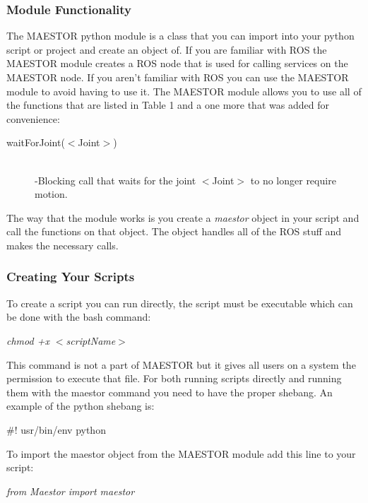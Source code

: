 \documentclass[12pt]{article}
\begin{document}
\subsubsection{Module Functionality}

The MAESTOR python module is a class that you can import into your python script or project and create an object of. If you are familiar with ROS the  MAESTOR module creates a ROS node that is used for calling services on the MAESTOR node. If you aren't familiar with ROS you can use the MAESTOR module to avoid having to use it. The MAESTOR module allows you to use all of the functions that are listed in Table 1 and a one more that was added for convenience: 

\begin{description}
	\item[waitForJoint($<$Joint$>$)] \hfill \\
	-Blocking call that waits for the joint $<$Joint$>$ to no longer require motion.
\end{description}

\noindent The way that the module works is you create a \textit{maestor} object in your script and call the functions on that object. The object handles all of the ROS stuff and makes the necessary calls. 

\subsubsection{Creating Your Scripts}

To create a script you can run directly, the script must be executable which can be done with the bash command:

\begin{center}
	\textit{chmod +x $<$scriptName$>$}
\end{center}

This command is not a part of MAESTOR but it gives all users on a system the permission to execute that file. For both running scripts directly and running them with the maestor command you need to have the proper shebang. An example of the python shebang is:

\begin{center}
	\#! usr/bin/env python
\end{center} 

To import the maestor object from the MAESTOR module add this line to your script:

\begin{center}
	\textit{from Maestor import maestor}
\end{center}
\end{document}
